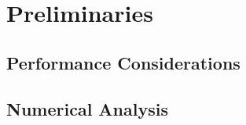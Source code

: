 \section{Preliminaries}

\subsection{Performance Considerations}

\subsection{Numerical Analysis}


